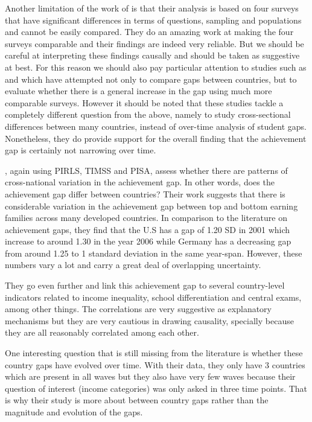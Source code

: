 \documentclass[11pt, a4paper]{article}\usepackage[]{graphicx}\usepackage[]{color}
\begin{document}
Another limitation of the work of \citet{bradbury2015} is that their analysis is based on four surveys that have significant differences in terms of questions, sampling and populations and cannot be easily compared. They do an amazing work at making the four surveys comparable and their findings are indeed very reliable.  But we should be careful at interpreting these findings causally and should be taken as suggestive at best. For this reason we should also pay particular attention to studies such as \citet{anna2016} and \citet{anna2016_global} which have attempted not only to compare gaps between countries, but to evaluate whether there is a general increase in the gap using much more comparable surveys. However it should be noted that these studies tackle a completely different question from the above, namely to study cross-sectional differences between many countries, instead of over-time analysis of student gaps. Nonetheless, they do provide support for the overall finding that the achievement gap is certainly not narrowing over time.

\citet{anna2016}, again using PIRLS, TIMSS and PISA, assess whether there are patterns of cross-national variation in the achievement gap. In other words, does the achievement gap differ between countries? Their work suggests that there is considerable variation in the achievement gap between top and bottom earning families across many developed countries. In comparison to the literature on achievement gaps, they find that the U.S has a gap of 1.20 SD in 2001 which increase to around 1.30 in the year 2006 while Germany has a decreasing gap from around 1.25 to 1 standard deviation in the same year-span. However, these numbers vary a lot and carry a great deal of overlapping uncertainty.

They go even further and link this achievement gap to several country-level indicators related to income inequality, school differentiation and central exams, among other things. The correlations are very suggestive  as explanatory mechanisms but they are very cautious in drawing causality, specially because they are all reasonably correlated among each other.

One interesting question that is still missing from the literature is whether these country gaps have evolved over time. With their data, they only have 3 countries which are present in all waves but they also have very few waves because their question of interest (income categories) was only asked in three time points. That is why their study is more about between country gaps rather than the magnitude and evolution of the gaps.
\end{document}
